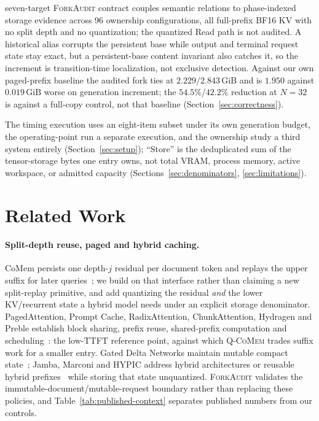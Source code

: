 \documentclass{article}
\newcommand{\qcomem}{\textsc{Q-CoMem}}
\newcommand{\method}{\textsc{ForkAudit}}
\newcommand{\gib}{\,\mathrm{GiB}}
\begin{document}
\begin{itemize}
seven-target \method{} contract couples semantic relations to phase-indexed
storage evidence across 96 ownership configurations, all full-prefix BF16 KV
with no split depth and no quantization; the quantized Read path is not audited.
A historical alias corrupts the persistent base while output and terminal
request state stay exact, but a persistent-base content invariant also catches
it, so the increment is transition-time localization, not exclusive detection.
Against our own paged-prefix baseline the audited fork ties at
$2.229/2.843\gib$ and is $1.950$ against $0.019\gib$ worse on generation
increment; the $54.5\%$/$42.2\%$ reduction at $N=32$ is against a full-copy
control, not that baseline (Section~\ref{sec:correctness}).
\end{itemize}

The timing execution uses an eight-item subset under its own generation budget,
the operating-point run a separate execution, and the ownership study a third
system entirely (Section~\ref{sec:setup}); ``Store'' is the deduplicated sum of
the tensor-storage bytes one entry owns, not total VRAM, process memory, active
workspace, or admitted capacity (Sections~\ref{sec:denominators}, \ref{sec:limitations}).


\section{Related Work}
\label{sec:related}

\paragraph{Split-depth reuse, paged and hybrid caching.}
CoMem persists one depth-$j$ residual per document token and replays the upper
suffix for later queries~\citep{liu2026comem,liu2026understanding}; we build on
that interface rather than claiming a new split-replay primitive, and add
quantizing the residual \emph{and} the lower KV/recurrent state a hybrid model
needs under an explicit storage denominator.  PagedAttention, Prompt Cache,
RadixAttention, ChunkAttention, Hydragen and Preble establish block sharing,
prefix reuse, shared-prefix computation and
scheduling~\citep{kwon2023pagedattention,gim2024promptcache,zheng2024sglang,
ye2024chunkattention,juravsky2024hydragen,srivatsa2025preble}: the low-TTFT
reference point, against which \qcomem{} trades suffix work for a smaller entry.
Gated Delta Networks maintain mutable compact
state~\citep{yang2025gateddeltanet}; Jamba, Marconi and HYPIC address hybrid
architectures or reusable hybrid
prefixes~\citep{lieber2025jamba,pan2025marconi,liu2026hypic} while storing that
state unquantized.  \method{} validates the immutable-document/mutable-request
boundary rather than replacing these policies, and
Table~\ref{tab:published-context} separates published numbers from our
controls.
\end{document}
